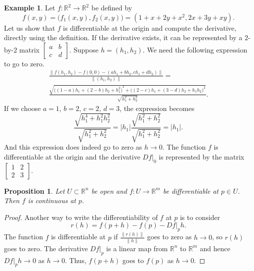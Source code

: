 \documentclass[12pt,openany]{book}
\newcommand{\sabs}[1]{\lvert {#1} \rvert}
\newcommand{\snorm}[1]{\lVert {#1} \rVert}
\newcommand{\R}{{\mathbb{R}}}
\theoremstyle{plain}
\newtheorem{prop}[thm]{Proposition}
\theoremstyle{remark}
\theoremstyle{definition}
\theoremstyle{exercise}
\theoremstyle{example}
\newtheorem{example}[thm]{Example}
\begin{document}
\begin{example}
Let $f \colon \R^2 \to \R^2$ be defined by
\begin{equation*}
f(x,y) = \bigl(f_1(x,y),f_2(x,y)\bigr) = (1+x+2y+x^2,2x+3y+xy).
\end{equation*}
Let us show that $f$ is differentiable at the origin and 
compute the derivative,
directly using the definition.  If the
derivative exists, it can be
represented by a $2$-by-$2$ matrix
$\left[\begin{smallmatrix}a&b\\c&d\end{smallmatrix}\right]$.  Suppose $h =
(h_1,h_2)$.  We need the following expression to go to zero.
\begin{multline*}
\frac{\snorm{
f(h_1,h_2)-f(0,0)
-
(ah_1 +bh_2 , ch_1+dh_2)}
}{\snorm{(h_1,h_2)}}
=
\\
\frac{\sqrt{
{\bigl((1-a)h_1 + (2-b)h_2 + h_1^2\bigr)}^2
+
{\bigl((2-c)h_1 + (3-d)h_2 + h_1h_2\bigr)}^2}}{\sqrt{h_1^2+h_2^2}} .
\end{multline*}
If we choose $a=1$, $b=2$, $c=2$, $d=3$, the expression becomes
\begin{equation*}
\frac{\sqrt{
h_1^4 + h_1^2h_2^2}}{\sqrt{h_1^2+h_2^2}}
=
\sabs{h_1}
\frac{\sqrt{
h_1^2 + h_2^2}}{\sqrt{h_1^2+h_2^2}}
= \sabs{h_1} .
\end{equation*}
And this expression does indeed go to zero as $h \to 0$.  The
function $f$ is differentiable at the origin and 
the derivative $Df|_0$ is represented by the matrix
$\left[\begin{smallmatrix}1&2\\2&3\end{smallmatrix}\right]$.
\end{example}

\begin{prop}
Let $U \subset \R^n$ be open and $f \colon U \to \R^m$ be
differentiable at $p \in U$.  Then $f$ is continuous at $p$.
\end{prop}

\begin{proof}
Another way to write the differentiability of $f$ at $p$ is to consider
\begin{equation*}
r(h) = f(p+h)-f(p) - Df|_p h .
\end{equation*}
The function $f$ is differentiable at $p$ if
$\frac{\snorm{r(h)}}{\snorm{h}}$ goes to zero as $h \to 0$,
so
$r(h)$ goes to zero.  The derivative $D f|_p$
is a linear map from $\R^n$ to $\R^m$ and hence
$D f|_p h \to 0$ as $h \to 0$.  Thus,
$f(p+h)$ goes to $f(p)$ as $h \to 0$.
\end{proof}
\end{document}
